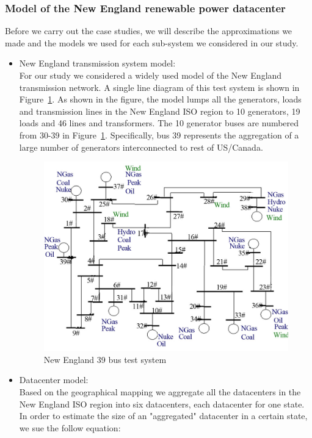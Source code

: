 \subsubsection{Model of the New England renewable power datacenter}
Before we carry out the case studies, we will describe the approximations we made and the models we used for each sub-system we considered in our study.
\begin{itemize}
\item{New England transmission system model: \\
For our study we considered a widely used  \cite{bills1970line} model of the New England transmission network. A single line diagram of this test system is shown in Figure~\ref{fig:newengland}. As shown in the figure, the model lumps all the generators, loads and transmission lines in the New England ISO region to 10 generators, 19 loads and 46 lines and transformers. The 10 generator buses are numbered from 30-39 in Figure~\ref{fig:newengland}. Specifically, bus 39 represents the aggregation of a large number of generators interconnected to rest of US/Canada.

\begin{figure}[ht]
\centering
\includegraphics[width=1\columnwidth]{img/newEngland.jpg}
\caption{New England 39 bus test system}
\label{fig:newengland}
\end{figure}
}

\item{Datacenter model: \\
Based on the geographical mapping we aggregate all the datacenters in the New England ISO region into six datacenters, each datacenter for one state. In order to estimate the size of an "aggregated" datacenter in a certain state, we sue the follow equation:

}
\end{itemize}
